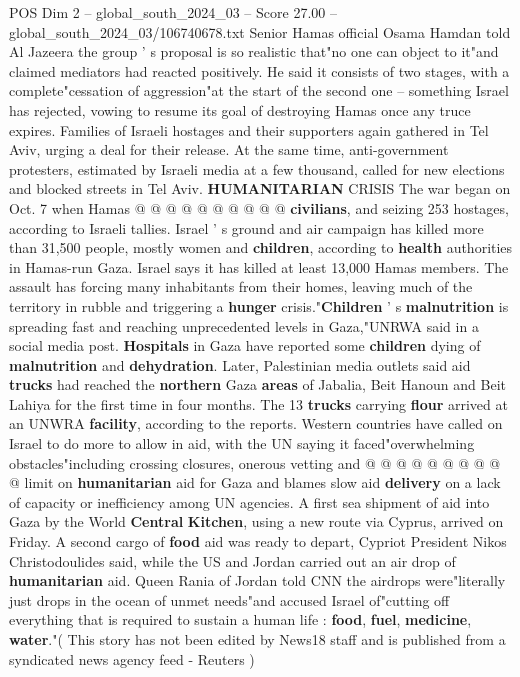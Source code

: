 \begin{textsample}{POS Dim 2 – global\_south\_2024\_03 – Score 27.00 – global\_south\_2024\_03/106740678.txt}
Senior Hamas official Osama Hamdan told Al Jazeera the group ' s proposal is so realistic that"no one can object to it"and claimed mediators had reacted positively.
He said it consists of two stages, with a complete"cessation of aggression"at the start of the second one -- something Israel has rejected, vowing to resume its goal of destroying Hamas once any truce expires.
Families of Israeli hostages and their supporters again gathered in Tel Aviv, urging a deal for their release.
At the same time, anti-government protesters, estimated by Israeli media at a few thousand, called for new elections and blocked streets in Tel Aviv. \textbf{HUMANITARIAN} CRISIS The war began on Oct. 7 when Hamas @ @ @ @ @ @ @ @ @ @ \textbf{civilians}, and seizing 253 hostages, according to Israeli tallies.
Israel ' s ground and air campaign has killed more than 31,500 people, mostly women and \textbf{children}, according to \textbf{health} authorities in Hamas-run Gaza.
Israel says it has killed at least 13,000 Hamas members.
The assault has forcing many inhabitants from their homes, leaving much of the territory in rubble and triggering a \textbf{hunger} crisis."\textbf{Children} ' s \textbf{malnutrition} is spreading fast and reaching unprecedented levels in Gaza,"UNRWA said in a social media post. \textbf{Hospitals} in Gaza have reported some \textbf{children} dying of \textbf{malnutrition} and \textbf{dehydration}.
Later, Palestinian media outlets said aid \textbf{trucks} had reached the \textbf{northern} Gaza \textbf{areas} of Jabalia, Beit Hanoun and Beit Lahiya for the first time in four months.
The 13 \textbf{trucks} carrying \textbf{flour} arrived at an UNWRA \textbf{facility}, according to the reports.
Western countries have called on Israel to do more to allow in aid, with the UN saying it faced"overwhelming obstacles"including crossing closures, onerous vetting and @ @ @ @ @ @ @ @ @ @ limit on \textbf{humanitarian} aid for Gaza and blames slow aid \textbf{delivery} on a lack of capacity or inefficiency among UN agencies.
A first sea shipment of aid into Gaza by the World \textbf{Central} \textbf{Kitchen}, using a new route via Cyprus, arrived on Friday.
A second cargo of \textbf{food} aid was ready to depart, Cypriot President Nikos Christodoulides said, while the US and Jordan carried out an air drop of \textbf{humanitarian} aid.
Queen Rania of Jordan told CNN the airdrops were"literally just drops in the ocean of unmet needs"and accused Israel of"cutting off everything that is required to sustain a human life : \textbf{food}, \textbf{fuel}, \textbf{medicine}, \textbf{water}."( This story has not been edited by News18 staff and is published from a syndicated news agency feed - Reuters )

\end{textsample}
